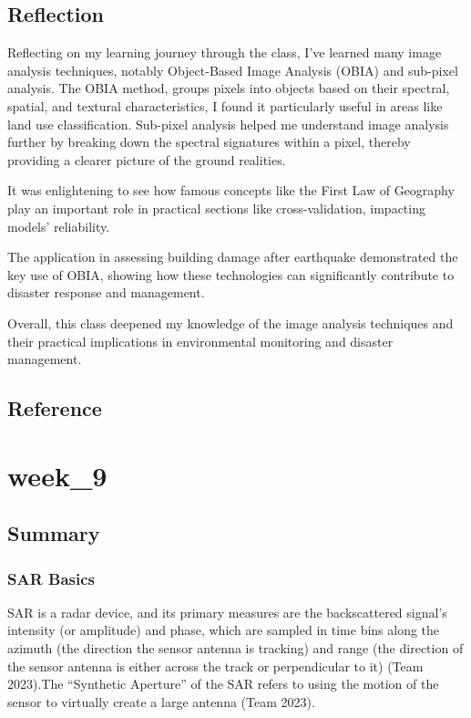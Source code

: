 \documentclass[
  letterpaper,
  DIV=11,
  numbers=noendperiod]{scrreprt}
\begin{document}
\section{Reflection}\label{reflection-4}

Reflecting on my learning journey through the class, I've learned many
image analysis techniques, notably Object-Based Image Analysis (OBIA)
and sub-pixel analysis. The OBIA method, groups pixels into objects
based on their spectral, spatial, and textural characteristics, I found
it particularly useful in areas like land use classification. Sub-pixel
analysis helped me understand image analysis further by breaking down
the spectral signatures within a pixel, thereby providing a clearer
picture of the ground realities.

It was enlightening to see how famous concepts like the First Law of
Geography play an important role in practical sections like
cross-validation, impacting models' reliability.

The application in assessing building damage after earthquake
demonstrated the key use of OBIA, showing how these technologies can
significantly contribute to disaster response and management.

Overall, this class deepened my knowledge of the image analysis
techniques and their practical implications in environmental monitoring
and disaster management.

\section{\texorpdfstring{\textbf{Reference}}{Reference}}\label{reference-1}


\chapter{week\_9}\label{week_9}

\section{Summary}\label{summary-3}

\subsection{SAR Basics}\label{sar-basics}

SAR is a radar device, and its primary measures are the backscattered
signal's intensity (or amplitude) and phase, which are sampled in time
bins along the azimuth (the direction the sensor antenna is tracking)
and range (the direction of the sensor antenna is either across the
track or perpendicular to it) (Team 2023).The ``Synthetic Aperture'' of
the SAR refers to using the motion of the sensor to virtually create a
large antenna (Team 2023).
\end{document}
